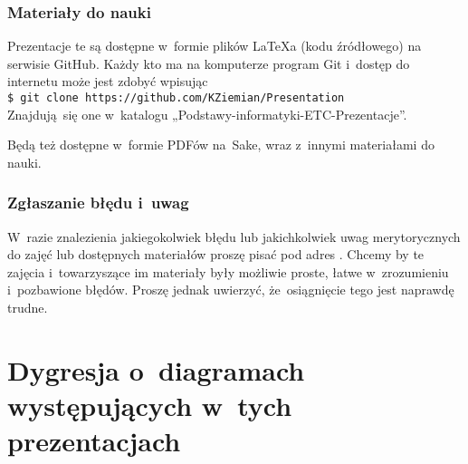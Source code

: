 \documentclass[10pt,t]{beamer}
\begin{document}
\begin{frame}
  \frametitle{Materiały do nauki}


  Prezentacje te są dostępne w~formie plików \LaTeX a (kodu źródłowego)
  na serwisie GitHub. Każdy kto ma na komputerze program Git i~dostęp
  do internetu może jest zdobyć wpisując \\
  \texttt{\$ git clone https://github.com/KZiemian/Presentation} \\
  Znajdują~się one w~katalogu „Podstawy-informatyki-ETC-Prezentacje”.

  Będą też dostępne w~formie PDFów na~Sake, wraz z~innymi materiałami
  do nauki.

\end{frame}





\begin{frame}
  \frametitle{Zgłaszanie błędu i~uwag}


  W~razie znalezienia jakiegokolwiek błędu lub jakichkolwiek uwag
  merytorycznych do zajęć lub dostępnych materiałów proszę pisać pod adres
  \email. Chcemy by te zajęcia i~towarzyszące im materiały były możliwie
  proste, łatwe w~zrozumieniu i~pozbawione błędów. Proszę jednak uwierzyć,
  że~osiągnięcie tego jest naprawdę trudne.

\end{frame}










\section{Dygresja o~diagramach występujących w~tych
  prezentacjach}
\end{document}
